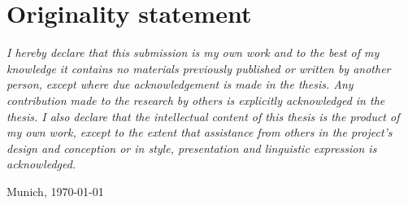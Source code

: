 \chapter*{Originality statement}

\textit{I hereby declare that this submission is my own work and to the best of my knowledge it contains no materials previously published or written by another person, except where due acknowledgement is made in the thesis. Any contribution made to the research by others is explicitly acknowledged in the thesis. I also declare that the intellectual content of this thesis is the product of my own work, except to the extent that assistance from others in the project's design and conception or in style, presentation and linguistic expression is acknowledged.}

Munich, \today